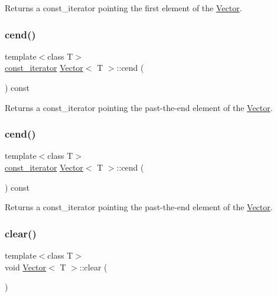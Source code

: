 Returns a const\+\_\+iterator pointing the first element of the \hyperlink{classVector}{Vector}. \mbox{\label{classVector_aab84ab1d529efc8949fb1891fe259f48}} 
\subsubsection{\texorpdfstring{cend()}{cend()}\hspace{0.1cm}{\footnotesize\ttfamily [1/2]}}
{\footnotesize\ttfamily template$<$class T$>$ \\
\hyperlink{classVector_a484e934cc06bb84c7d70042e792b6e55}{const\+\_\+iterator} \hyperlink{classVector}{Vector}$<$ T $>$\+::cend (\begin{DoxyParamCaption}{ }\end{DoxyParamCaption}) const\hspace{0.3cm}{\ttfamily [inline]}}

Returns a const\+\_\+iterator pointing the {\ttfamily past-\/the-\/end} element of the \hyperlink{classVector}{Vector}. \mbox{\label{classVector_aab84ab1d529efc8949fb1891fe259f48}} 
\subsubsection{\texorpdfstring{cend()}{cend()}\hspace{0.1cm}{\footnotesize\ttfamily [2/2]}}
{\footnotesize\ttfamily template$<$class T$>$ \\
\hyperlink{classVector_a484e934cc06bb84c7d70042e792b6e55}{const\+\_\+iterator} \hyperlink{classVector}{Vector}$<$ T $>$\+::cend (\begin{DoxyParamCaption}{ }\end{DoxyParamCaption}) const\hspace{0.3cm}{\ttfamily [inline]}}

Returns a const\+\_\+iterator pointing the {\ttfamily past-\/the-\/end} element of the \hyperlink{classVector}{Vector}. \mbox{\label{classVector_a32ad98b135472b0ebc5d6cb3ae5d0085}} 
\subsubsection{\texorpdfstring{clear()}{clear()}\hspace{0.1cm}{\footnotesize\ttfamily [1/2]}}
{\footnotesize\ttfamily template$<$class T$>$ \\
void \hyperlink{classVector}{Vector}$<$ T $>$\+::clear (\begin{DoxyParamCaption}{ }\end{DoxyParamCaption})\hspace{0.3cm}{\ttfamily [inline]}}



